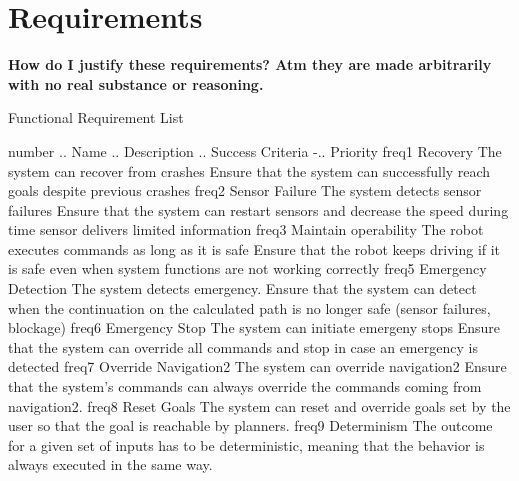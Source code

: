 \section{Requirements}

\textbf{How do I justify these requirements? Atm they are made arbitrarily with no real substance or reasoning.}

Functional Requirement List

number .. Name .. Description .. Success Criteria -.. Priority
freq1 Recovery The system can recover from crashes Ensure that the system can successfully reach goals despite previous crashes
freq2 Sensor Failure	The system detects sensor failures	Ensure that the system can restart sensors and decrease the speed during time sensor delivers limited information
freq3	Maintain operability The robot executes commands as long as it is safe	Ensure that the robot keeps driving if it is safe even when system functions are not working correctly
freq5	Emergency Detection	The system detects emergency. Ensure that the system can detect when the continuation on the calculated path is no longer safe (sensor failures, blockage)
freq6	Emergency Stop The system can initiate emergeny stops	Ensure that the system can override all commands and stop in case an emergency is detected
freq7	Override Navigation2 The system can override navigation2	Ensure that the system's commands can always override the commands coming from navigation2.
freq8 Reset Goals The system can reset and override goals set by the user so that the goal is reachable by planners.
freq9 Determinism The outcome for a given set of inputs has to be deterministic, meaning that the behavior is always executed in the same way. 


